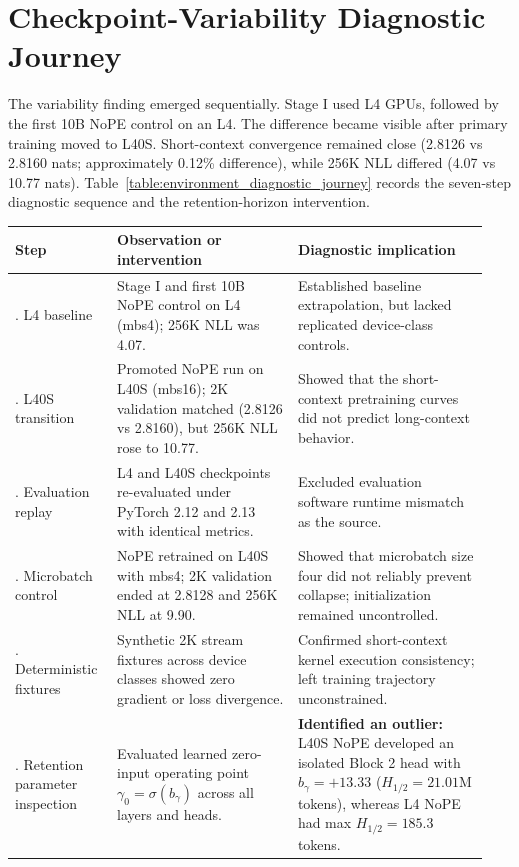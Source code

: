 \section{Checkpoint-Variability Diagnostic Journey}
\label{appendix:environment}

The variability finding emerged sequentially. Stage I used L4 GPUs, followed by the first 10B NoPE control on an L4. The difference became visible after primary training moved to L40S. Short-context convergence remained close (2.8126 vs 2.8160 nats; approximately 0.12\% difference), while 256K NLL differed (4.07 vs 10.77 nats). Table~\ref{table:environment_diagnostic_journey} records the seven-step diagnostic sequence and the retention-horizon intervention.

\begin{table}[!ht]
\centering
\small
\setlength{\tabcolsep}{4pt}
\begin{tabular}{>{\raggedright\arraybackslash}p{0.20\linewidth}>{\raggedright\arraybackslash}p{0.36\linewidth}>{\raggedright\arraybackslash}p{0.38\linewidth}}
\toprule
\textbf{Step} & \textbf{Observation or intervention} & \textbf{Diagnostic implication} \\
\midrule
1. L4 baseline & Stage I and first 10B NoPE control on L4 (mbs4); 256K NLL was 4.07. & Established baseline extrapolation, but lacked replicated device-class controls. \\
2. L40S transition & Promoted NoPE run on L40S (mbs16); 2K validation matched (2.8126 vs 2.8160), but 256K NLL rose to 10.77. & Showed that the short-context pretraining curves did not predict long-context behavior. \\
3. Evaluation replay & L4 and L40S checkpoints re-evaluated under PyTorch 2.12 and 2.13 with identical metrics. & Excluded evaluation software runtime mismatch as the source. \\
4. Microbatch control & NoPE retrained on L40S with mbs4; 2K validation ended at 2.8128 and 256K NLL at 9.90. & Showed that microbatch size four did not reliably prevent collapse; initialization remained uncontrolled. \\
5. Deterministic fixtures & Synthetic 2K stream fixtures across device classes showed zero gradient or loss divergence. & Confirmed short-context kernel execution consistency; left training trajectory unconstrained. \\
6. Retention parameter inspection & Evaluated learned zero-input operating point $\gamma_0 = \sigma(b_\gamma)$ across all layers and heads. & \textbf{Identified an outlier:} L40S NoPE developed an isolated Block 2 head with $b_\gamma = +13.33$ ($H_{1/2} = 21.01$M tokens), whereas L4 NoPE had max $H_{1/2} = 185.3$ tokens. \\

\end{tabular}
\end{table}
